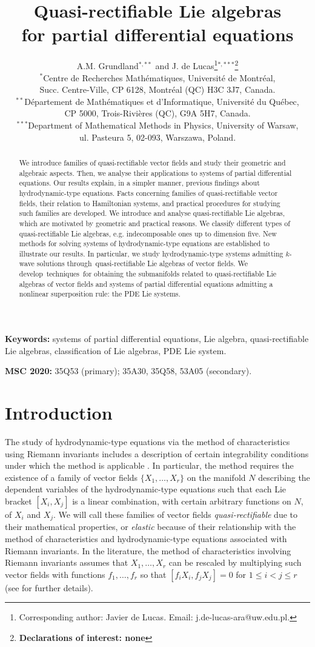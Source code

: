 \documentclass[12pt]{article}
\title{Quasi-rectifiable Lie algebras \\ for partial differential equations}
\author{A.M. Grundland$^{*,**}$ and J. de Lucas\footnote{Corresponding author: Javier de Lucas. Email: j.de-lucas-ara@uw.edu.pl. }$^{*,***}$\footnote{{\bf Declarations of interest: none}} \\$^*$Centre de Recherches Mathématiques, Université de Montréal,\\Succ. Centre-Ville, CP 6128, Montréal (QC) H3C 3J7, Canada.\\$^{**}$D\'epartement de Math\'ematiques et d'Informatique, Université du Québec,\\ CP 5000, Trois-Rivières (QC), G9A 5H7, Canada.\\ $^{***}$Department of Mathematical Methods in Physics, University of Warsaw,\\ ul. Pasteura 5, 02-093, Warszawa, Poland.}
\date{}
\theoremstyle{plain}
\theoremstyle{definition}
\numberwithin{equation}{section}
\begin{document}
\maketitle
\begin{abstract}
    We introduce families of quasi-rectifiable vector fields and study their geometric and algebraic aspects. Then, we analyse their applications to systems of partial differential equations. Our results explain, in a simpler manner, previous findings about hydrodynamic-type equations. Facts concerning families of quasi-rectifiable vector fields, their relation to Hamiltonian systems, and practical procedures for studying such families are developed. We introduce and analyse quasi-rectifiable Lie algebras, which are motivated by geometric and practical reasons. We classify different types of quasi-rectifiable Lie algebras, e.g. indecomposable ones up to dimension five. New methods for solving systems of hydrodynamic-type equations are established to illustrate our results. In particular, we study hydrodynamic-type systems admitting $k$-wave solutions through quasi-rectifiable Lie algebras of vector fields. We develop techniques for obtaining the submanifolds related to quasi-rectifiable Lie algebras of vector fields and systems of partial differential equations admitting a nonlinear superposition rule: the PDE Lie systems.
\end{abstract}
{\bf Keywords:} systems of partial differential equations, Lie algebra, quasi-rectifiable Lie algebras, classification of Lie algebras, PDE Lie system.

{\bf MSC 2020:} 35Q53 (primary); 35A30, 35Q58, 53A05 (secondary).

\newpage
\tableofcontents
\section{Introduction}
The study of hydrodynamic-type equations \cite{Pe72,RY83,Za79,Za80} via the method of characteristics using Riemann invariants includes a description of certain integrability conditions under which the method is applicable \cite{Je76,Ma84,Mi58,Pe85,Po08,Ri58,Za79,Za80}. In particular, the method requires the existence of a family of vector fields $\{X_1,\ldots,X_r\}$ on the manifold $N$ describing the dependent variables of the hydrodynamic-type equations such that each Lie bracket $[X_i,X_j]$ is a linear combination, with certain arbitrary functions on $N$, of $X_i$ and $X_j$. We will call these families of vector fields {\it quasi-rectifiable} due to their mathematical properties, or {\it elastic} because of their relationship with the method of characteristics and hydrodynamic-type equations associated with Riemann invariants. In the literature, the method of characteristics involving Riemann invariants assumes that $X_1,\ldots,X_r$ can be rescaled by multiplying such vector fields with functions $f_1,\ldots,f_r$ so that $[f_iX_i,f_jX_j]=0$ for $1\leq i<j\leq r$ (see \cite{GV91} for further details). 
\end{document}
